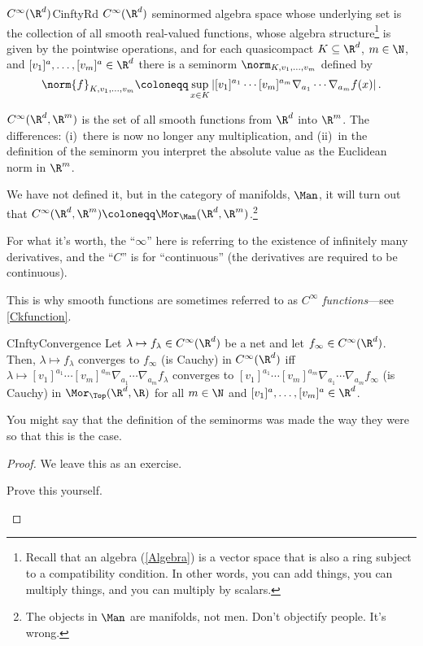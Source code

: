 \begin{dfn}{$C^\infty (\R ^d)$}{CinftyRd}
$C^\infty (\R ^d)$ seminormed algebra space whose underlying set is the collection of all smooth real-valued functions, whose algebra structure\footnote{Recall that an algebra (\cref{Algebra}) is a vector space that is also a ring subject to a compatibility condition.  In other words, you can add things, you can multiply things, and you can multiply by scalars.} is given by the pointwise operations, and for each quasicompact $K\subseteq \R ^d$, $m\in \N$, and $[v_1]^a,\ldots ,[v_m]^a\in \R ^d$ there is a seminorm $\norm_{K,v_1,\ldots ,v_m}$ defined by
\begin{equation*}
\norm{f}_{K,v_1,\ldots ,v_m}\coloneqq \sup _{x\in K}\left| [v_1]^{a_1}\cdots [v_m]^{a_m}\nabla _{a_1}\cdots \nabla _{a_m}f(x)\right| .
\end{equation*}
\begin{rmk}
$C ^{\infty}(\R ^d,\R ^m)$ is the set of all smooth functions from $\R ^d$ into $\R ^m$.  The differences:  (i)~there is now no longer any multiplication, and (ii)~in the definition of the seminorm you interpret the absolute value as the Euclidean norm in $\R ^m$.
\end{rmk}
\begin{rmk}
We have not defined it, but in the category of manifolds, $\Man$, it will turn out that $C^\infty (\R ^d,\R ^m)\coloneqq \Mor _{\Man}(\R ^d,\R ^m)$.\footnote{The objects in $\Man$ are manifolds, not men.  Don't objectify people.  It's wrong.}
\end{rmk}
\begin{rmk}
For what it's worth, the ``$\infty$'' here is referring to the existence of infinitely many derivatives, and the ``$C$'' is for ``continuous'' (the derivatives are required to be continuous).
\end{rmk}
\begin{rmk}
This is why smooth functions are sometimes referred to as \emph{$C^{\infty}$ functions}---see \cref{Ckfunction}.
\end{rmk}
\end{dfn}
\begin{prp}{}{CInftyConvergence}
Let $\lambda \mapsto f_\lambda \in C^{\infty}(\R ^d)$ be a net and let $f_\infty \in C^{\infty}(\R ^d)$.  Then, $\lambda \mapsto f_\lambda$ converges to $f_\infty$ (is Cauchy) in $C^{\infty}(\R ^d)$ iff $\lambda \mapsto [v_1]^{a_1}\cdots [v_m]^{a_m}\nabla _{a_1}\cdots \nabla _{a_m}f_\lambda$ converges to $[v_1]^{a_1}\cdots [v_m]^{a_m}\nabla _{a_1}\cdots \nabla _{a_m}f_\infty$ (is Cauchy) in $\Mor _{
\Top}(\R ^d,\R )$ for all $m\in \N$ and $[v_1]^a,\ldots ,[v_m]^a\in \R ^d$.
\begin{rmk}
You might say that the definition of the seminorms was made the way they were so that this is the case.
\end{rmk}
\begin{proof}
We leave this as an exercise.
\begin{exr}[breakable=false]{}{}
Prove this yourself.
\end{exr}
\end{proof}
\end{prp}

